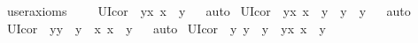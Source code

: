 \begin{isabellebody}
\ {\isacharbrackleft}user{\isacharunderscore}axioms{\isacharbrackright}%
\isadelimproof
\ %
\endisadelimproof
%
\isatagproof
{}\isamarkupfalse%
\ %
%
\endisatagproof
{\isafoldproof}%
%
\isadelimproof
%
\endisadelimproof
\isanewline
{}\isamarkupfalse%
\ UI{\isacharunderscore}cor{}\ {\isacharcolon}\ {\isachardoublequoteopen}\isactrlbold {\isasymforall}y{\isachardot}{\isacharparenleft}{\isacharparenleft}\isactrlbold {\isasymforall}x{\isachardot}\ {\isasymPhi}{\isacharparenleft}x{\isacharparenright}{\isacharparenright}\ \isactrlbold {\isasymrightarrow}\ {\isasymPhi}{\isacharparenleft}y{\isacharparenright}{\isacharparenright}{\isachardoublequoteclose}%
\isadelimproof
\ %
\endisadelimproof
%
\isatagproof
{}\isamarkupfalse%
\ auto%
\endisatagproof
{\isafoldproof}%
%
\isadelimproof
%
\endisadelimproof
\isanewline
{}\isamarkupfalse%
\ UI{\isacharunderscore}cor{}\ {\isacharcolon}\ {\isachardoublequoteopen}\isactrlbold {\isasymforall}y{\isachardot}{\isacharparenleft}{\isacharparenleft}\isactrlbold {\isasymforall}x{\isachardot}\ \isactrlbold {\isasymnot}{\isacharparenleft}x\ \isactrlbold {\isacharequal}\ y{\isacharparenright}{\isacharparenright}\ \isactrlbold {\isasymrightarrow}\ \isactrlbold {\isasymnot}{\isacharparenleft}y\ \isactrlbold {\isacharequal}\ y{\isacharparenright}{\isacharparenright}{\isachardoublequoteclose}%
\isadelimproof
\ %
\endisadelimproof
%
\isatagproof
{}\isamarkupfalse%
\ auto%
\endisatagproof
{\isafoldproof}%
%
\isadelimproof
%
\endisadelimproof
\isanewline
{}\isamarkupfalse%
\ UI{\isacharunderscore}cor{}\ {\isacharcolon}\ {\isachardoublequoteopen}\isactrlbold {\isasymforall}y{\isachardot}{\isacharparenleft}{\isacharparenleft}y\ \isactrlbold {\isacharequal}\ y{\isacharparenright}\ \isactrlbold {\isasymrightarrow}\ {\isacharparenleft}\isactrlbold {\isasymexists}x{\isachardot}\ x\ \isactrlbold {\isacharequal}\ y{\isacharparenright}{\isacharparenright}{\isachardoublequoteclose}%
\isadelimproof
\ %
\endisadelimproof
%
\isatagproof
{}\isamarkupfalse%
\ auto%
\endisatagproof
{\isafoldproof}%
%
\isadelimproof
%
\endisadelimproof
\isanewline
{}\isamarkupfalse%
\ UI{\isacharunderscore}cor{}\ {\isacharcolon}\ {\isachardoublequoteopen}{\isacharparenleft}\isactrlbold {\isasymforall}y{\isachardot}\ y\ \isactrlbold {\isacharequal}\ y{\isacharparenright}\ \isactrlbold {\isasymrightarrow}\ {\isacharparenleft}\isactrlbold {\isasymforall}y{\isachardot}\isactrlbold {\isasymexists}x{\isachardot}\ x\ \isactrlbold {\isacharequal}\ y{\isacharparenright}{\isachardoublequoteclose}%

\end{isabellebody}
